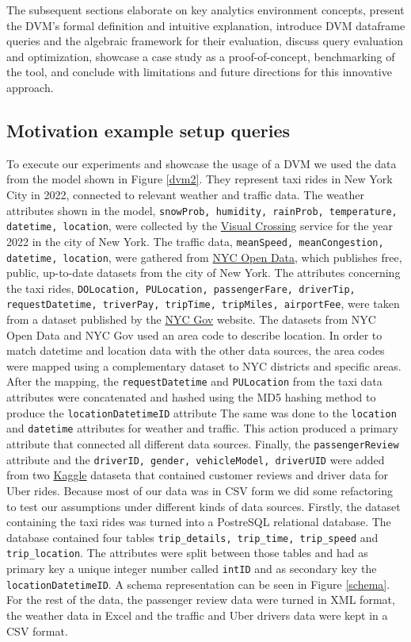 The subsequent sections elaborate on key analytics environment concepts, present the DVM's formal definition and intuitive explanation, introduce DVM dataframe queries and the algebraic framework for their evaluation, discuss query evaluation and optimization, showcase a case study as a proof-of-concept, benchmarking of the tool, and conclude with limitations and future directions for this innovative approach.

\subsection{Motivation example setup queries}

To execute our experiments and showcase the usage of a DVM we used the data from the model shown in Figure \ref{dvm2}. They represent taxi rides in New York City in 2022, connected to relevant weather and traffic data. The weather attributes shown in the model, \texttt{snowProb, humidity, rainProb, temperature, datetime, location},  were collected by the \href{https://www.visualcrossing.com/}{Visual Crossing} service for the year 2022 in the city of New York. The traffic data, \texttt{meanSpeed, meanCongestion, datetime, location}, were gathered from \href{https://opendata.cityofnewyork.us/}{NYC Open Data}, which publishes free, public, up-to-date datasets from the city of New York. The attributes concerning the taxi rides, \texttt{DOLocation, PULocation, passengerFare, driverTip, requestDatetime, triverPay, tripTime, tripMiles, airportFee}, were taken from a dataset published by the \href{https://www.nyc.gov/site/tlc/about/tlc-trip-record-data.page}{NYC Gov} website. The datasets from NYC Open Data and NYC Gov used an area code to describe location. In order to match datetime and location data with the other data sources, the area codes were mapped using a complementary dataset to NYC districts and specific areas. After the mapping, the \texttt{requestDatetime} and \texttt{PULocation} from the taxi data attributes were concatenated and hashed using the MD5 hashing method to produce the \texttt{locationDatetimeID} attribute The same was done to the \texttt{location} and \texttt{datetime} attributes for weather and traffic. This action produced a primary attribute that connected all different data sources. Finally, the \texttt{passengerReview} attribute and the \texttt{driverID, gender, vehicleModel, driverUID} were added from two \href{https://www.kaggle.com/}{Kaggle} dataseta that contained customer reviews and driver data for Uber rides. Because most of our data was in CSV form we did some refactoring to test our assumptions under different kinds of data sources. Firstly, the dataset containing the taxi rides was turned into a PostreSQL relational database. The database contained four tables \texttt{trip\_details, trip\_time, trip\_speed} and \texttt{trip\_location}. The attributes were split between those tables and had as primary key a unique integer number called \texttt{intID} and as secondary key the \texttt{locationDatetimeID}. A schema representation can be seen in Figure \ref{schema}. For the rest of the data, the passenger review data were turned in XML format, the weather data in Excel and the traffic and Uber drivers data were kept in a CSV format.

